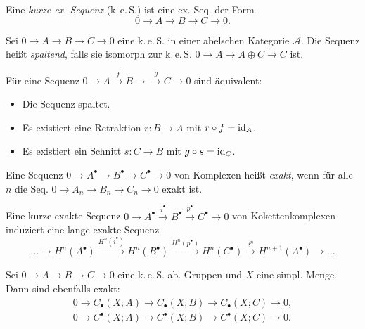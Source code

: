 \documentclass{cheat-sheet}
\newcommand{\CC}[1]{{#1}_{\bullet}} %
\newcommand{\CCC}[1]{{#1}^{\bullet}} %
\newcommand{\keS}{k.\,e.\,S.} %
\begin{document}
\begin{defn}
  Eine \emph{kurze ex. Sequenz} (\keS{}) ist eine ex. Seq. der Form
  \[ 0 \to A \to B \to C \to 0. \]
\end{defn}

\begin{defn}
  Sei $0 \to A \to B \to C \to 0$ eine \keS{} in einer abelschen Kategorie $\mathcal{A}$. Die Sequenz heißt \emph{spaltend}, falls sie isomorph zur \keS{} $0 \to A \to A \oplus C \to C$ ist.
\end{defn}

\begin{prop}
  Für eine Sequenz $0 \to A \xrightarrow{f} B \to \xrightarrow{g} C \to 0$ sind äquivalent:
  \begin{itemize}
    \item Die Sequenz spaltet.
    \item Es existiert eine Retraktion $r : B \to A$ mit $r \circ f = \mathrm{id}_A$.
    \item Es existiert ein Schnitt $s : C \to B$ mit $g \circ s = \mathrm{id}_C$.
  \end{itemize}
\end{prop}

\begin{defn}
  Eine Sequenz $0 \to \CCC{A} \to \CCC{B} \to \CCC{C} \to 0$ von Komplexen heißt \emph{exakt}, wenn für alle $n$ die Seq. $0 \to A_n \to B_n \to C_n \to 0$ exakt ist.
\end{defn}


\begin{prop}
  Eine kurze exakte Sequenz
  $0 \to \CCC{A} \xrightarrow{i^\bullet} \CCC{B} \xrightarrow{p^\bullet} \CCC{C} \to 0$
  von Kokettenkomplexen induziert eine lange exakte Sequenz
  \[ ... \to H^n(\CCC{A}) \xrightarrow{H^n(i^\bullet)} H^n(\CCC{B}) \xrightarrow{H^n(p^\bullet)} H^n(\CCC{C}) \xrightarrow{\delta^n} H^{n+1}(\CCC{A}) \to ... \]
\end{prop}

\begin{lem}
  Sei $0 \to A \to B \to C \to 0$ eine \keS{} ab. Gruppen und $X$ eine simpl. Menge.
  Dann sind ebenfalls exakt:
  \begin{align*}
    0 \to \CC{C}(X; A) \to \CC{C}(X; B) \to \CC{C}(X; C) \to 0, \\
    0 \to \CCC{C}(X; A) \to \CCC{C}(X; B) \to \CCC{C}(X; C) \to 0.
  \end{align*}
\end{lem}
\end{document}
